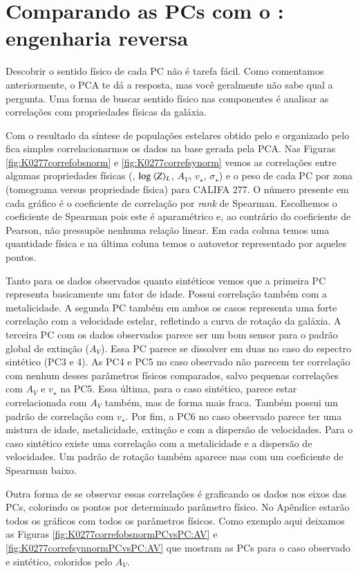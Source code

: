 \section{Comparando as PCs com o \STARLIGHT: engenharia reversa}
\label{sec:PCAaplic:EngRev}

Descobrir o sentido físico de cada PC não é tarefa fácil. Como comentamos anteriormente, o PCA te dá a resposta, mas
você geralmente não sabe qual a pergunta. Uma forma de buscar sentido físico nas componentes é analisar as correlações
com propriedades físicas da galáxia.

Com o resultado da síntese de populações estelares obtido pelo \starlight e organizado pelo \pycasso fica simples
correlacionarmos os dados na base gerada pela PCA. Nas Figuras \ref{fig:K0277correfobsnorm} e
\ref{fig:K0277correfsynorm} vemos as correlações entre algumas propriedades físicas (, $\log\ \meanL{Z}$,
$A_V$, $v_{\star}$, $\sigma_{\star}$) e o peso de cada PC por zona (tomograma versus propriedade física) para CALIFA
277. O número presente em cada gráfico é o coeficiente de correlação por {\em rank} de Spearman. Escolhemos o
coeficiente de Spearman pois este é aparamétrico e, ao contrário do coeficiente de Pearson, não pressupõe nenhuma
relação linear. Em cada coluna temos uma quantidade física e na última coluna temos o autovetor representado por aqueles
pontos.

Tanto para os dados observados quanto sintéticos vemos que a primeira PC representa basicamente um fator de idade.
Possui correlação também com a metalicidade. A segunda PC também em ambos os casos representa uma forte correlação com a
velocidade estelar, refletindo a curva de rotação da galáxia. A terceira PC com os dados observados parece ser um bom
sensor para o padrão global de extinção ($A_V$). Essa PC parece se dissolver em duas no caso do espectro sintético (PC3
e 4). As PC4 e PC5 no caso observado não parecem ter correlação com nenhum desses parâmetros físicos comparados, salvo
pequenas correlações com $A_V$ e $v_\star$ na PC5. Essa última, para o caso sintético, parece estar correlacionada com
$A_V$ também, mas de forma mais fraca. Também possui um padrão de correlação com $v_\star$. Por fim, a PC6 no caso
observado parece ter uma mistura de idade, metalicidade, extinção e com a dispersão de velocidades. Para o caso
sintético existe uma correlação com a metalicidade e a dispersão de velocidades. Um padrão de rotação também aparece mas
com um coeficiente de Spearman baixo.

Outra forma de se observar essas correlações é graficando os dados nos eixos das PCs, colorindo os pontos por
determinado parâmetro físico. No Apêndice estarão todos os gráficos com todos os parâmetros físicos. Como exemplo aqui
deixamos as Figuras \ref{fig:K0277correfobsnormPCvsPC:AV} e \ref{fig:K0277correfsynnormPCvsPC:AV} que mostram
as PCs para o caso observado e sintético, coloridos pelo $A_V$.

